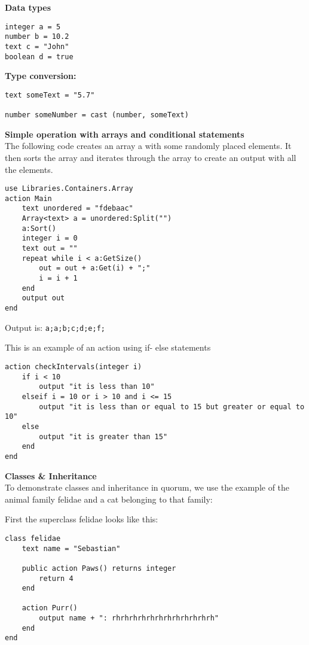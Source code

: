 \textbf{Data types}\\
\begin{lstlisting}[language=Quorum]
integer a = 5
number b = 10.2
text c = "John"
boolean d = true
\end{lstlisting}

\textbf{Type conversion:}\\
\begin{lstlisting}[language=Quorum]
text someText = "5.7"

number someNumber = cast (number, someText)
\end{lstlisting}

\textbf{Simple operation with arrays and conditional statements}\\
The following code creates an array a with some randomly placed elements. It then sorts the array and iterates through the array to create an output with all the elements.

\begin{lstlisting}[language=Quorum]
use Libraries.Containers.Array
action Main
	text unordered = "fdebaac"
	Array<text> a = unordered:Split("")
	a:Sort()
	integer i = 0
	text out = ""
	repeat while i < a:GetSize()
		out = out + a:Get(i) + ";"
		i = i + 1
	end
	output out
end
\end{lstlisting}

Output is:
\lstinline!a;a;b;c;d;e;f;!

This is an example of an action using if- else statements

\begin{lstlisting}[language=Quorum]
action checkIntervals(integer i)
    if i < 10
        output "it is less than 10"
    elseif i = 10 or i > 10 and i <= 15
        output "it is less than or equal to 15 but greater or equal to 10"
    else
        output "it is greater than 15"
    end
end
\end{lstlisting}

\textbf{Classes \& Inheritance}\\
To demonstrate classes and inheritance in quorum, we use the example of the animal family felidae and a cat belonging to that family:

First the superclass felidae looks like this:

\begin{lstlisting}[language=Quorum]
class felidae 
    text name = "Sebastian"

    public action Paws() returns integer
        return 4
    end

    action Purr()
        output name + ": rhrhrhrhrhrhrhrhrhrhrhrh"
    end
end
\end{lstlisting}

